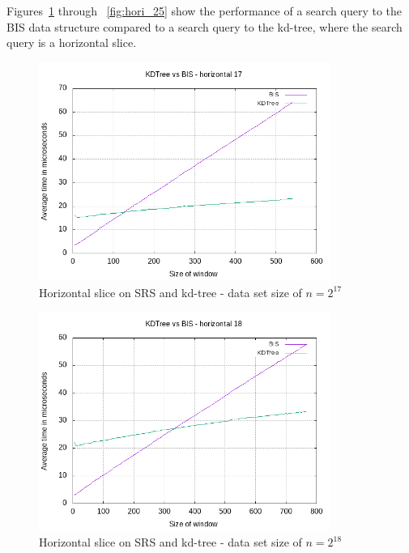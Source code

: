 Figures~\ref{fig:hori_17} through ~\ref{fig:hori_25} show the performance of a search query to the BIS data structure compared to a search query to the kd-tree, where the search query is a horizontal slice.


\begin{figure}[h]
    \centering
    \includegraphics[width = 0.85\textwidth]{pictures/analysis/hori_17.png}
    \caption{Horizontal slice on SRS and kd-tree - data set size of $n=2^{17}$}\label{fig:hori_17}
\end{figure}

\begin{figure}[h]
    \centering
    \includegraphics[width = 0.85\textwidth]{pictures/analysis/hori_18.png}
    \caption{Horizontal slice on SRS and kd-tree - data set size of $n=2^{18}$}\label{fig:hori_18}
\end{figure}

